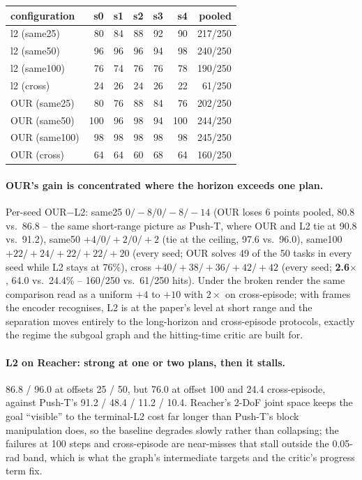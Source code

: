 \documentclass[11pt]{article}
\begin{document}
\begin{center}\small
\begin{tabular}{lrrrrrr}
\toprule
configuration & s0 & s1 & s2 & s3 & s4 & pooled \\
\midrule
l2 (same25) & 80 & 84 & 88 & 92 & 90 & 217/250 \\
l2 (same50) & 96 & 96 & 96 & 94 & 98 & 240/250 \\
l2 (same100) & 76 & 74 & 76 & 76 & 78 & 190/250 \\
l2 (cross) & 24 & 26 & 24 & 26 & 22 & 61/250 \\
\midrule
OUR (same25) & 80 & 76 & 88 & 84 & 76 & 202/250 \\
OUR (same50) & 100 & 96 & 98 & 94 & 100 & 244/250 \\
OUR (same100) & 98 & 98 & 98 & 98 & 98 & 245/250 \\
OUR (cross) & 64 & 64 & 60 & 68 & 64 & 160/250 \\
\bottomrule
\end{tabular}
\end{center}

\paragraph{OUR's gain is concentrated where the horizon exceeds one plan.} Per-seed OUR$-$L2:
same25 $0/{-}8/0/{-}8/{-}14$ (OUR loses 6 points pooled, 80.8 vs.\ 86.8 -- the same short-range
picture as Push-T, where OUR and L2 tie at 90.8 vs.\ 91.2), same50 $+4/0/{+}2/0/{+}2$ (tie at
the ceiling, 97.6 vs.\ 96.0), same100 $+22/{+}24/{+}22/{+}22/{+}20$ (every seed; OUR solves 49 of
the 50 tasks in every seed while L2 stays at 76\%), cross $+40/{+}38/{+}36/{+}42/{+}42$ (every
seed; \textbf{2.6$\times$}, 64.0 vs.\ 24.4\% -- 160/250 vs.\ 61/250 hits). Under the broken
render the same comparison read as a uniform $+4$ to $+10$ with $2\times$ on cross-episode;
with frames the encoder recognises, L2 is at the paper's level at short range and the
separation moves entirely to the long-horizon and cross-episode protocols, exactly the
regime the subgoal graph and the hitting-time critic are built for.

\paragraph{L2 on Reacher: strong at one or two plans, then it stalls.} 86.8 / 96.0 at offsets
25 / 50, but 76.0 at offset 100 and 24.4 cross-episode, against Push-T's 91.2 / 48.4 / 11.2 /
10.4. Reacher's 2-DoF joint space keeps the goal ``visible'' to the terminal-L2 cost far longer
than Push-T's block manipulation does, so the baseline degrades slowly rather than collapsing;
the failures at 100 steps and cross-episode are near-misses that stall outside the 0.05-rad
band, which is what the graph's intermediate targets and the critic's progress term fix.
\end{document}
